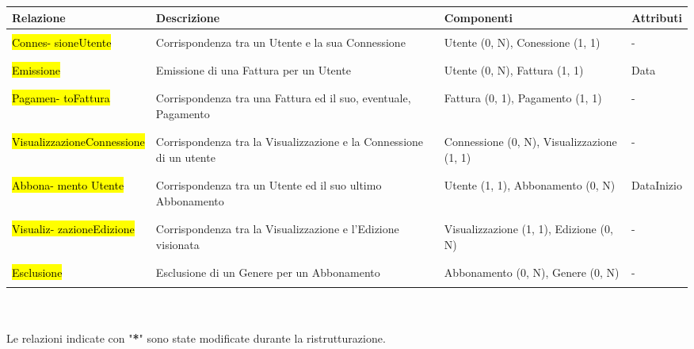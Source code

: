 \documentclass{article}
\begin{document}
%
%
%
%
%
%
%
%
\begin{tabular}{|C{2cm}|C{4.5cm}|C{2.4cm}|C{2cm}|}
\hline
 \textbf{Relazione}& \textbf{Descrizione}& \textbf{Componenti}& \textbf{Attributi}\\ 
\hline
\hline
& & & \\
 \hl{Connes- sioneUtente} & Corrispondenza tra un Utente e la sua Connessione & Utente (0, N), Conessione (1, 1) & - \\ 
& & & \\
\hline 
& & & \\
 \hl{Emissione} & Emissione di una Fattura per un Utente & Utente (0, N), Fattura (1, 1) & Data \\ 
& & & \\
\hline
& & & \\
 \hl{Pagamen- toFattura} & Corrispondenza tra una Fattura ed il suo, eventuale, Pagamento & Fattura (0, 1), Pagamento (1, 1) & - \\ 
& & & \\
\hline
& & & \\
 \hl{VisualizzazioneConnessione} &  Corrispondenza tra la Visualizzazione e la Connessione di un utente & Connessione (0, N), Visualizzazione (1, 1) & - \\ 
& & & \\
\hline 
& & & \\
 \hl{Abbona- mento Utente} &  Corrispondenza tra un Utente ed il suo ultimo Abbonamento & Utente (1, 1), Abbonamento (0, N) & DataInizio \\
& & & \\
\hline 
& & & \\
 \hl{Visualiz- zazioneEdizione} & Corrispondenza tra la Visualizzazione e l'Edizione visionata & Visualizzazione (1, 1), Edizione (0, N) & - \\ 
& & & \\
\hline
& & & \\
 \hl{Esclusione} & Esclusione di un Genere per un Abbonamento & Abbonamento (0, N), Genere (0, N) & - \\ 
& & & \\
\hline
\end{tabular}
\\ \\ 
%
%
%
%
%
%
%
% 
Le relazioni indicate con "\textbf{*}" sono state modificate durante la ristrutturazione.
\end{document}
